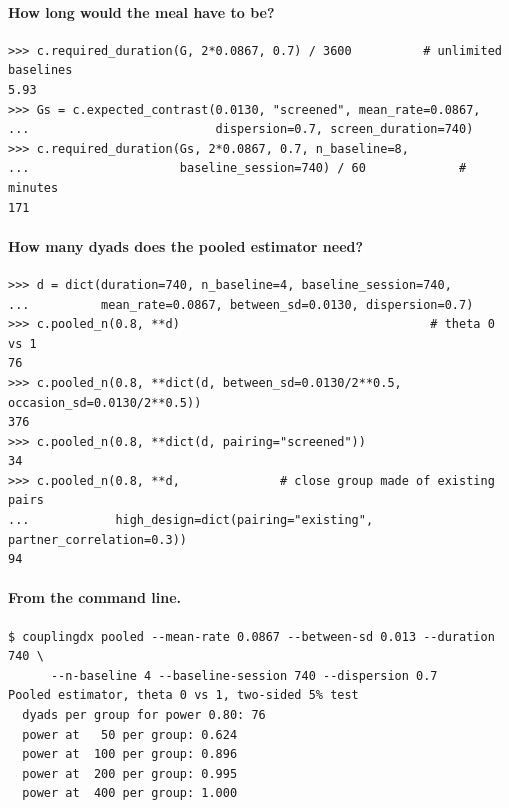 \documentclass[12pt]{article}
\theoremstyle{definition}
\begin{document}
\paragraph{How long would the meal have to be?}
\begin{verbatim}
>>> c.required_duration(G, 2*0.0867, 0.7) / 3600          # unlimited baselines
5.93
>>> Gs = c.expected_contrast(0.0130, "screened", mean_rate=0.0867,
...                          dispersion=0.7, screen_duration=740)
>>> c.required_duration(Gs, 2*0.0867, 0.7, n_baseline=8,
...                     baseline_session=740) / 60             # minutes
171
\end{verbatim}

\paragraph{How many dyads does the pooled estimator need?}
\begin{verbatim}
>>> d = dict(duration=740, n_baseline=4, baseline_session=740,
...          mean_rate=0.0867, between_sd=0.0130, dispersion=0.7)
>>> c.pooled_n(0.8, **d)                                   # theta 0 vs 1
76
>>> c.pooled_n(0.8, **dict(d, between_sd=0.0130/2**0.5, occasion_sd=0.0130/2**0.5))
376
>>> c.pooled_n(0.8, **dict(d, pairing="screened"))
34
>>> c.pooled_n(0.8, **d,              # close group made of existing pairs
...            high_design=dict(pairing="existing", partner_correlation=0.3))
94
\end{verbatim}

\paragraph{From the command line.}
\begin{verbatim}
$ couplingdx pooled --mean-rate 0.0867 --between-sd 0.013 --duration 740 \
      --n-baseline 4 --baseline-session 740 --dispersion 0.7
Pooled estimator, theta 0 vs 1, two-sided 5% test
  dyads per group for power 0.80: 76
  power at   50 per group: 0.624
  power at  100 per group: 0.896
  power at  200 per group: 0.995
  power at  400 per group: 1.000
\end{verbatim}
\end{document}
